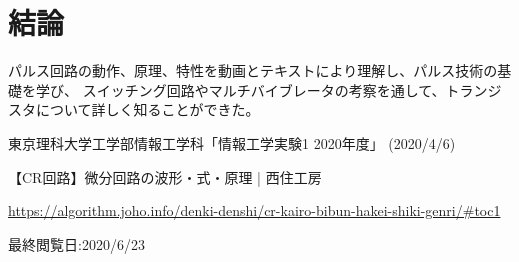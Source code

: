 \documentclass[12pt]{jarticle}
\begin{document}
\section{結論}
パルス回路の動作、原理、特性を動画とテキストにより理解し、パルス技術の基礎を学び、
スイッチング回路やマルチバイブレータの考察を通して、トランジスタについて詳しく知ることができた。

\clearpage
\begin{thebibliography}{99}
    \label{sannkoubunnkenn_chapter}
    東京理科大学工学部情報工学科「情報工学実験1 2020年度」
    (2020/4/6)

    【CR回路】微分回路の波形・式・原理  |  西住工房

    \url{https://algorithm.joho.info/denki-denshi/cr-kairo-bibun-hakei-shiki-genri/#toc1}

    最終閲覧日:2020/6/23

\end{thebibliography}

\clearpage
\appendix
\end{document}
